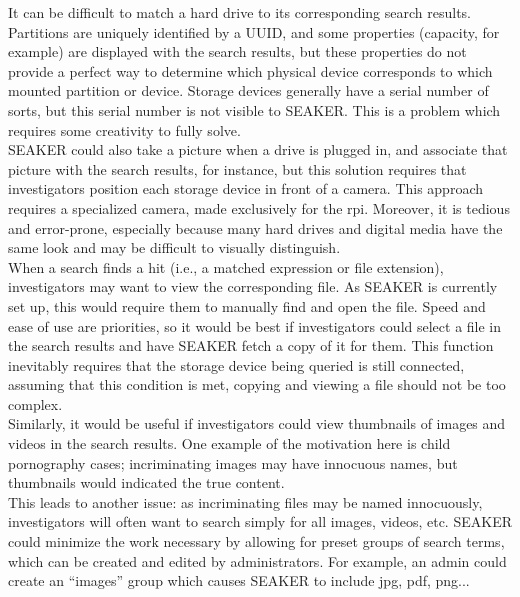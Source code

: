 \documentclass[12pt]{article}
\begin{document}
It can be difficult to match a hard drive to its corresponding search results. Partitions are uniquely
identified by a UUID, and some properties (capacity, for example) are displayed with the search results,
but these properties do not provide a perfect way to determine which physical device corresponds to
which mounted partition or device. Storage devices generally have a serial number of sorts, but this
serial number is not visible to SEAKER. This is a problem which requires some creativity to fully solve.\\

SEAKER could also take a picture when a drive is plugged in, and associate that picture with the search
results, for instance, but this solution requires that investigators position each storage device in front of
a camera.  This approach requires a specialized camera, made exclusively for the \gls{rpi}.  Moreover,
it is tedious and error-prone, especially because many hard drives and digital media have the same look
and may be difficult to visually distinguish.\\

When a search finds a hit (i.e., a matched expression or file extension), investigators may want to
view the corresponding file. As SEAKER is currently set up, this would require them to manually find and open the file. Speed
and ease of use are priorities, so it would be best if investigators could select a file in the search results
and have SEAKER fetch a copy of it for them. This function inevitably requires that the storage device
being queried is still connected, assuming that this condition is met, copying and viewing a file should
not be too complex.\\

Similarly, it would be useful if investigators could view thumbnails of images and videos in the search
results. One example of the motivation here is child pornography cases; incriminating images may have
innocuous names, but thumbnails would indicated the true content.\\

This leads to another issue: as incriminating files may be named innocuously, investigators will often
want to search simply for all images, videos, etc. SEAKER could minimize the work necessary by
allowing for preset groups of search terms, which can be created and edited by administrators. For
example, an admin could create an ``images'' group which causes SEAKER to include jpg, pdf, png...\\
\end{document}
